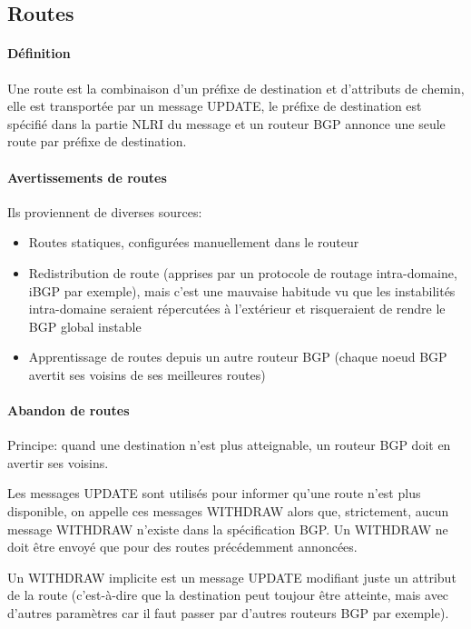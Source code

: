 \documentclass{report}
\begin{document}
\subsection{Routes}

\paragraph{Définition}

Une route est la combinaison d'un préfixe de destination et
d'attributs de chemin, elle est transportée par un message UPDATE, le
préfixe de destination est spécifié dans la partie NLRI du message et
un routeur BGP annonce une seule route par préfixe de destination.

\paragraph{Avertissements de routes}

Ils proviennent de diverses sources:

\begin{itemize}
\item Routes statiques, configurées manuellement dans le routeur
\item Redistribution de route (apprises par un protocole de routage
  intra-domaine, iBGP par exemple), mais c'est une mauvaise habitude
  vu que les instabilités intra-domaine seraient répercutées à
  l'extérieur et risqueraient de rendre le BGP global instable
\item Apprentissage de routes depuis un autre routeur BGP (chaque
  noeud BGP avertit ses voisins de ses meilleures routes)
\end{itemize}

\paragraph{Abandon de routes}

Principe: quand une destination n'est plus atteignable, un routeur BGP
doit en avertir ses voisins.

Les messages UPDATE sont utilisés pour informer qu'une route n'est
plus disponible, on appelle ces messages WITHDRAW alors que,
strictement, aucun message WITHDRAW n'existe dans la spécification
BGP. Un WITHDRAW ne doit être envoyé que pour des routes précédemment
annoncées.

Un WITHDRAW implicite est un message UPDATE modifiant juste un
attribut de la route (c'est-à-dire que la destination peut toujour
être atteinte, mais avec d'autres paramètres car il faut passer par
d'autres routeurs BGP par exemple).
\end{document}
